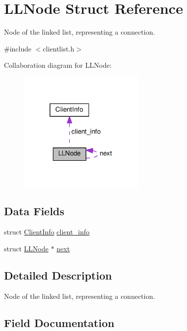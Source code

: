 \hypertarget{structLLNode}{}\section{L\+L\+Node Struct Reference}
\label{structLLNode}


Node of the linked list, representing a connection.  




{\ttfamily \#include $<$clientlist.\+h$>$}



Collaboration diagram for L\+L\+Node\+:\nopagebreak
\begin{figure}[H]
\begin{center}
\leavevmode
\includegraphics[width=175pt]{structLLNode__coll__graph}
\end{center}
\end{figure}
\subsection*{Data Fields}
\begin{DoxyCompactItemize}
\item 
struct \hyperlink{structClientInfo}{Client\+Info} \hyperlink{structLLNode_ab4552dd6aa88846b769ed067679858c4}{client\+\_\+info}
\item 
struct \hyperlink{structLLNode}{L\+L\+Node} $\ast$ \hyperlink{structLLNode_a55f6432e4bb952037758122d032aaaf2}{next}
\end{DoxyCompactItemize}


\subsection{Detailed Description}
Node of the linked list, representing a connection. 

\subsection{Field Documentation}
